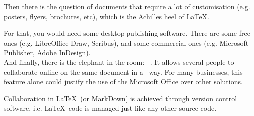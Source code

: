 Then 
there is the question of documents that require a lot of customisation (e.g. posters, flyers, brochures, etc), which is the Achilles heel of \LaTeX.

For that, you would need some desktop publishing software. There are some free ones (e.g. LibreOffice Draw, Scribus), and some commercial ones (e.g. Microsoft Publisher, Adobe InDesign). \\


And 
finally, there is the elephant in the room: \Microsoft\ \Word. It allows several people to collaborate online on the same document in a \WYSIWYG\ way. For many businesses, this feature alone could justify the use of the Microsoft Office over other solutions.

Collaboration in \LaTeX\ (or MarkDown) is achieved through version control software, i.e. \LaTeX\ code is managed just like any other source code.



